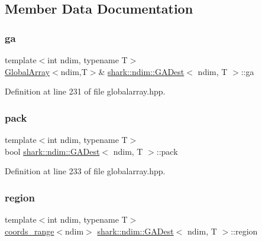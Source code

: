 \subsection{Member Data Documentation}
\hypertarget{classshark_1_1ndim_1_1_g_a_dest_aa64cb1bd1f2155c6cca997e4ba69760e}{}\label{classshark_1_1ndim_1_1_g_a_dest_aa64cb1bd1f2155c6cca997e4ba69760e} 
\subsubsection{\texorpdfstring{ga}{ga}}
{\footnotesize\ttfamily template$<$int ndim, typename T$>$ \\
\hyperlink{classshark_1_1ndim_1_1_global_array}{Global\+Array}$<$ndim,T$>$\& \hyperlink{classshark_1_1ndim_1_1_g_a_dest}{shark\+::ndim\+::\+G\+A\+Dest}$<$ ndim, T $>$\+::ga\hspace{0.3cm}{\ttfamily [private]}}



Definition at line 231 of file globalarray.\+hpp.

\hypertarget{classshark_1_1ndim_1_1_g_a_dest_aeef6b8ca8d9d57db09b32949e0493aca}{}\label{classshark_1_1ndim_1_1_g_a_dest_aeef6b8ca8d9d57db09b32949e0493aca} 
\subsubsection{\texorpdfstring{pack}{pack}}
{\footnotesize\ttfamily template$<$int ndim, typename T$>$ \\
bool \hyperlink{classshark_1_1ndim_1_1_g_a_dest}{shark\+::ndim\+::\+G\+A\+Dest}$<$ ndim, T $>$\+::pack\hspace{0.3cm}{\ttfamily [private]}}



Definition at line 233 of file globalarray.\+hpp.

\hypertarget{classshark_1_1ndim_1_1_g_a_dest_a13e2c3f9bc86ceec20bd4c98bf4699b2}{}\label{classshark_1_1ndim_1_1_g_a_dest_a13e2c3f9bc86ceec20bd4c98bf4699b2} 
\subsubsection{\texorpdfstring{region}{region}}
{\footnotesize\ttfamily template$<$int ndim, typename T$>$ \\
\hyperlink{structshark_1_1ndim_1_1coords__range}{coords\+\_\+range}$<$ndim$>$ \hyperlink{classshark_1_1ndim_1_1_g_a_dest}{shark\+::ndim\+::\+G\+A\+Dest}$<$ ndim, T $>$\+::region\hspace{0.3cm}{\ttfamily [private]}}



